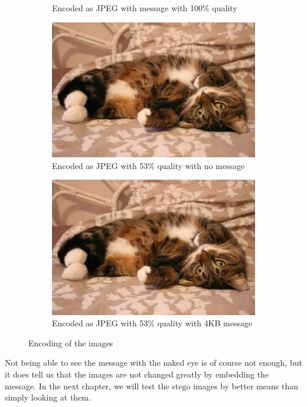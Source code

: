 \begin{figure}[H]
\begin{subfigure}[b]{0.45\textwidth}
		\caption{Encoded as JPEG with message with 100\% quality}
		\label{fig:catHighMessage}
    \end{subfigure}
    \begin{subfigure}[b]{0.45\textwidth}
        \includegraphics[width=\textwidth]{figures/catToTestNoMessage.jpeg}
		\caption{Encoded as JPEG with 53\% quality with no message}
		\label{fig:catJPEGNoMessage}
    \end{subfigure}
    \begin{subfigure}[b]{0.45\textwidth}
        \includegraphics[width=\textwidth]{figures/catToTestWithMessage.jpeg}
		\caption{Encoded as JPEG with 53\% quality with 4KB message}
		\label{fig:catJPEGMessage}
    \end{subfigure}
    \caption{Encoding of the images\citep{FlickrImageCat}}
    \label{fig:ResultEncoding}
\end{figure}

Not being able to see the message with the naked eye is of course not enough, but it does tell us that the images are not changed greatly by embedding the message. In the next chapter, we will test the stego images by better means than simply looking at them. 
